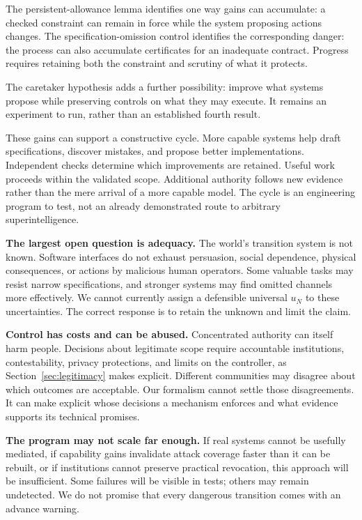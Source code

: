 \documentclass[10pt,twocolumn,letterpaper]{article}
\newcommand{\para}[1]{\smallskip\noindent\textbf{#1}\enspace}
\begin{document}
The persistent-allowance lemma identifies one way gains can accumulate: a checked constraint can remain in force while the system proposing actions changes. The specification-omission control identifies the corresponding danger: the process can also accumulate certificates for an inadequate contract. Progress requires retaining both the constraint and scrutiny of what it protects.

The caretaker hypothesis adds a further possibility: improve what systems propose while preserving controls on what they may execute. It remains an experiment to run, rather than an established fourth result.

These gains can support a constructive cycle. More capable systems help draft specifications, discover mistakes, and propose better implementations. Independent checks determine which improvements are retained. Useful work proceeds within the validated scope. Additional authority follows new evidence rather than the mere arrival of a more capable model. The cycle is an engineering program to test, not an already demonstrated route to arbitrary superintelligence.

\para{The largest open question is adequacy.} The world's transition system is not known. Software interfaces do not exhaust persuasion, social dependence, physical consequences, or actions by malicious human operators. Some valuable tasks may resist narrow specifications, and stronger systems may find omitted channels more effectively. We cannot currently assign a defensible universal $u_N$ to these uncertainties. The correct response is to retain the unknown and limit the claim.

\para{Control has costs and can be abused.} Concentrated authority can itself harm people. Decisions about legitimate scope require accountable institutions, contestability, privacy protections, and limits on the controller, as Section~\ref{sec:legitimacy} makes explicit. Different communities may disagree about which outcomes are acceptable. Our formalism cannot settle those disagreements. It can make explicit whose decisions a mechanism enforces and what evidence supports its technical promises.

\para{The program may not scale far enough.} If real systems cannot be usefully mediated, if capability gains invalidate attack coverage faster than it can be rebuilt, or if institutions cannot preserve practical revocation, this approach will be insufficient. Some failures will be visible in tests; others may remain undetected. We do not promise that every dangerous transition comes with an advance warning.
\end{document}
